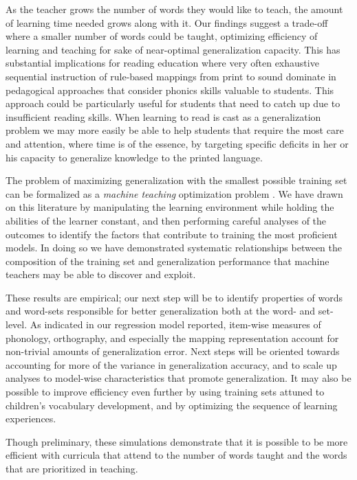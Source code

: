 \documentclass[10pt,letterpaper]{article}
\begin{document}
As the teacher grows the number of words they would like to teach, the amount of learning time needed grows along with it. Our findings suggest a trade-off where a smaller number of words could be taught, optimizing efficiency of learning and teaching for sake of near-optimal generalization capacity. This has substantial implications for reading education where very often exhaustive sequential instruction of rule-based mappings from print to sound dominate in pedagogical approaches that consider phonics skills valuable to students. This approach could be particularly useful for students that need to catch up due to insufficient reading skills. When learning to read is cast as a generalization problem we may more easily be able to help students that require the most care and attention, where time is of the essence, by targeting specific deficits in her or his capacity to generalize knowledge to the printed language.

The problem of maximizing generalization with the smallest possible training set can be formalized as a \emph{machine teaching} optimization problem \cite{Zhu2015}. We have drawn on this literature by manipulating the learning environment while holding the abilities of the learner constant, and then performing careful analyses of the outcomes to identify the factors that contribute to training the most proficient models. In doing so we have demonstrated systematic relationships between the composition of the training set and generalization performance that machine teachers may be able to discover and exploit. 

These results are empirical; our next step will be to identify properties of words and word-sets responsible for better generalization both at the word- and set-level. As indicated in our regression model reported, item-wise measures of phonology, orthography, and especially the mapping representation account for non-trivial amounts of generalization error. Next steps will be oriented towards accounting for more of the variance in generalization accuracy, and to scale up analyses to model-wise characteristics that promote generalization. It may also be possible to improve efficiency even further by using training sets attuned to children's vocabulary development, and by optimizing the sequence of learning experiences.

Though preliminary, these simulations demonstrate that it is possible to be more efficient with curricula that attend to the number of words taught and the words that are prioritized in teaching.
\end{document}
